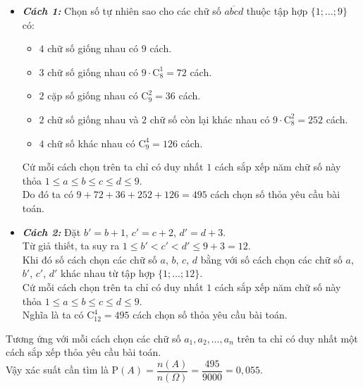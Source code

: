 \begin{vd}
{		\begin{itemize}
			\item \textit{\textbf{Cách 1:}} Chọn số tự nhiên sao cho các chữ số $\overline{abcd}$ thuộc tập hợp $\{1;\ldots;9\}$ có:
			\begin{itemize}
				\item $4$ chữ số giống nhau có $9$ cách.
				\item $3$ chữ số giống nhau có $9\cdot\mathrm{C}_8^1=72$ cách.
				\item $2$ cặp số giống nhau có $\mathrm{C}_9^2=36$ cách.
				\item $2$ chữ số giống nhau và $2$ chữ số còn lại khác nhau có $9\cdot\mathrm{C}_8^2=252$ cách.
				\item $4$ chữ số khác nhau có $\mathrm{C}_9^4=126$ cách.
			\end{itemize}
			Cứ mỗi cách chọn trên ta chỉ có duy nhất $1$ cách sắp xếp năm chữ số này thỏa $1\leq a\leq b\leq c\leq d\leq 9$.\\
			Do đó ta có $9+72+36+252+126=495$ cách chọn số thỏa yêu cầu bài toán.
			\item \textit{\textbf{Cách 2:}} Đặt $b'=b+1$, $c'=c+2$, $d'=d+3$.\\
			Từ giả thiết, ta suy ra $1\leq b'<c'<d'\leq 9+3=12$.\\
			Khi đó số cách chọn các chữ số $a$, $b$, $c$, $d$ bằng với số cách chọn các chữ số $a$, $b'$, $c'$, $d'$ khác nhau từ tập hợp $\{1;\ldots;12\}$.\\
			Cứ mỗi cách chọn trên ta chỉ có duy nhất $1$ cách sắp xếp năm chữ số này thỏa $1\leq a\leq b\leq c\leq d\leq 9$.\\
			Nghĩa là ta có $\mathrm{C}_{12}^4=495$ cách chọn số thỏa yêu cầu bài toán.
		\end{itemize}
		Tương ứng với mỗi cách chọn các chữ số $a_1,a_2,\ldots,a_n$ trên ta chỉ có duy nhất một cách sắp xếp thỏa yêu cầu bài toán.\\
		Vậy xác suất cần tìm là $\mathrm{P}(A)=\dfrac{n(A)}{n(\Omega)}=\dfrac{495}{9000}=0{,}055$.
	}
\end{vd}



